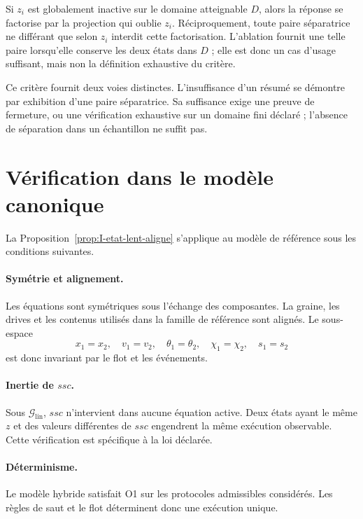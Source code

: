 \begin{encadre}[title={Corollaire \theproposition{} --- Factorisation et test par ablation}]
Si $z_i$ est globalement inactive sur le domaine atteignable $D$, alors
la réponse se factorise par la projection qui oublie $z_i$. Réciproquement,
toute paire séparatrice ne différant que selon $z_i$ interdit cette
factorisation. L'ablation fournit une telle paire lorsqu'elle conserve
les deux états dans $D$ ; elle est donc un cas d'usage suffisant, mais
non la définition exhaustive du critère.
\end{encadre}

Ce critère fournit deux voies distinctes. L'insuffisance d'un résumé se
démontre par exhibition d'une paire séparatrice. Sa suffisance exige une
preuve de fermeture, ou une vérification exhaustive sur un domaine fini
déclaré ; l'absence de séparation dans un échantillon ne suffit pas.

\section{Vérification dans le modèle canonique}
\label{annexe-I-verification-canonique}

La Proposition~\ref{prop:I-etat-lent-aligne} s'applique au modèle de référence sous les
conditions suivantes.

\paragraph{Symétrie et alignement.}
Les équations sont symétriques sous l'échange des composantes. La graine,
les drives et les contenus utilisés dans la famille de référence sont
alignés. Le sous-espace
\[
x_1=x_2,
\quad v_1=v_2,
\quad \theta_1=\theta_2,
\quad \chi_1=\chi_2,
\quad s_1=s_2
\]
est donc invariant par le flot et les événements.

\paragraph{Inertie de $ssc$.}
Sous $\mathcal G_{\mathrm{lin}}$, $ssc$ n'intervient dans aucune équation
active. Deux états ayant le même $z$ et des valeurs différentes de
$ssc$ engendrent la même exécution observable. Cette vérification est
spécifique à la loi déclarée.

\paragraph{Déterminisme.}
Le modèle hybride satisfait O1 sur les protocoles admissibles considérés.
Les règles de saut et le flot déterminent donc une exécution unique.

